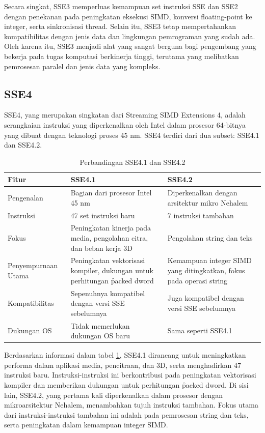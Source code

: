 Secara singkat, SSE3 memperluas kemampuan set instruksi SSE dan SSE2 dengan penekanan pada peningkatan eksekusi SIMD, konversi floating-point ke integer, serta sinkronisasi thread. Selain itu, SSE3 tetap mempertahankan kompatibilitas dengan jenis data dan lingkungan pemrograman yang sudah ada. Oleh karena itu, SSE3 menjadi alat yang sangat berguna bagi pengembang yang bekerja pada tugas komputasi berkinerja tinggi, terutama yang melibatkan pemrosesan paralel dan jenis data yang kompleks.

\subsection{SSE4}
SSE4, yang merupakan singkatan dari Streaming SIMD Extensions 4, adalah serangkaian instruksi yang diperkenalkan oleh Intel dalam prosesor 64-bitnya yang dibuat dengan teknologi proses 45 nm. SSE4 terdiri dari dua subset: SSE4.1 dan SSE4.2\cite{sse4reference}.

\begin{table}[h]
	\centering
	\begin{tabular}{|p{3cm}|p{4.6cm}|p{4.6cm}|}
		\hline
		\textbf{Fitur} & \textbf{SSE4.1} & \textbf{SSE4.2} \\ \hline
		Pengenalan & Bagian dari prosesor Intel 45 nm & Diperkenalkan dengan arsitektur mikro Nehalem \\ \hline
		Instruksi & 47 set instruksi baru & 7 instruksi tambahan \\ \hline
		Fokus & Peningkatan kinerja pada media, pengolahan citra, dan beban kerja 3D & Pengolahan string dan teks \\ \hline
		Penyempurnaan Utama & Peningkatan vektorisasi kompiler, dukungan untuk perhitungan \f{packed dword} & Kemampuan integer SIMD yang ditingkatkan, fokus pada operasi string \\ \hline
		Kompatibilitas & Sepenuhnya kompatibel dengan versi SSE sebelumnya & Juga kompatibel dengan versi SSE sebelumnya \\ \hline
		Dukungan OS & Tidak memerlukan dukungan OS baru & Sama seperti SSE4.1 \\ \hline
	\end{tabular}
	\caption{Perbandingan SSE4.1 dan SSE4.2}
	\label{table:perbandingan_sse4}
\end{table}

Berdasarkan informasi dalam tabel \ref{table:perbandingan_sse4}, SSE4.1 dirancang untuk meningkatkan performa dalam aplikasi media, pencitraan, dan 3D, serta menghadirkan 47 instruksi baru. Instruksi-instruksi ini berkontribusi pada peningkatan vektorisasi kompiler dan memberikan dukungan untuk perhitungan \f{packed dword}. Di sisi lain, SSE4.2, yang pertama kali diperkenalkan dalam prosesor dengan mikroarsitektur Nehalem, menambahkan tujuh instruksi tambahan. Fokus utama dari instruksi-instruksi tambahan ini adalah pada pemrosesan string dan teks, serta peningkatan dalam kemampuan integer SIMD\cite{sse4reference}.

